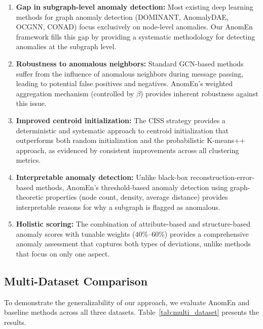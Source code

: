 \documentclass[10pt,twocolumn,a4paper]{article}
\begin{document}
\begin{enumerate}
    \item \textbf{Gap in subgraph-level anomaly detection:} Most existing deep learning methods for graph anomaly detection (DOMINANT, AnomalyDAE, OCGNN, CONAD) focus exclusively on node-level anomalies. Our AnomEn framework fills this gap by providing a systematic methodology for detecting anomalies at the subgraph level.

    \item \textbf{Robustness to anomalous neighbors:} Standard GCN-based methods suffer from the influence of anomalous neighbors during message passing, leading to potential false positives and negatives. AnomEn's weighted aggregation mechanism (controlled by $\beta$) provides inherent robustness against this issue.

    \item \textbf{Improved centroid initialization:} The CISS strategy provides a deterministic and systematic approach to centroid initialization that outperforms both random initialization and the probabilistic K-means++ approach, as evidenced by consistent improvements across all clustering metrics.

    \item \textbf{Interpretable anomaly detection:} Unlike black-box reconstruction-error-based methods, AnomEn's threshold-based anomaly detection using graph-theoretic properties (node count, density, average distance) provides interpretable reasons for why a subgraph is flagged as anomalous.

    \item \textbf{Holistic scoring:} The combination of attribute-based and structure-based anomaly scores with tunable weights (40\%--60\%) provides a comprehensive anomaly assessment that captures both types of deviations, unlike methods that focus on only one aspect.
\end{enumerate}

\subsection{Multi-Dataset Comparison}

To demonstrate the generalizability of our approach, we evaluate AnomEn and baseline methods across all three datasets. Table~\ref{tab:multi_dataset} presents the results.
\end{document}
